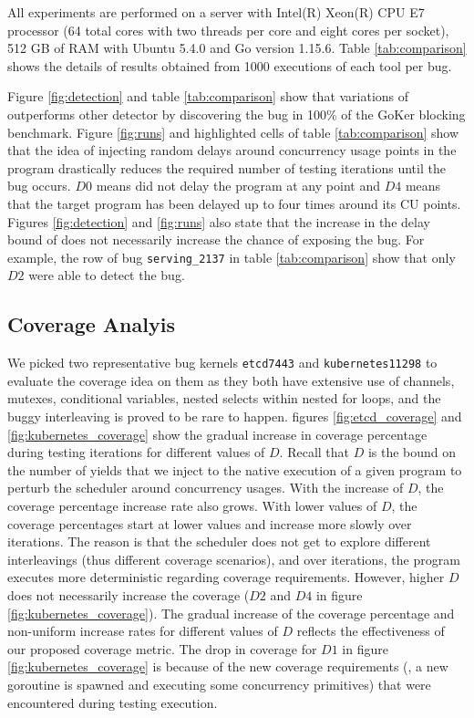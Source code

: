 All experiments are performed on a server with Intel(R) Xeon(R) CPU E7 processor (64 total cores with two threads per core and eight cores per socket), 512 GB of RAM with Ubuntu 5.4.0 and Go version 1.15.6.
%
Table \ref{tab:comparison} shows the details of results obtained from 1000 executions of each tool per bug.
%

%


%
Figure \ref{fig:detection} and table \ref{tab:comparison} show that variations of \goat outperforms other detector by discovering the bug in 100\% of the GoKer blocking benchmark.
%
Figure \ref{fig:runs} and highlighted cells of table \ref{tab:comparison} show that the idea of injecting random delays around concurrency usage points in the program drastically reduces the required number of testing iterations until the bug occurs.
%
$D0$ means \goat did not delay the program at any point and $D4$ means that the target program has been delayed up to four times around its CU points.
%
Figures \ref{fig:detection} and \ref{fig:runs} also state that the increase in the delay bound of \goat does not necessarily increase the chance of exposing the bug.
%
For example, the row of bug \texttt{serving\_2137} in table \ref{tab:comparison} show that only \goat $D2$ were able to detect the bug.




\subsection{Coverage Analyis}
We picked two representative bug kernels \texttt{etcd7443} and \texttt{kubernetes11298} to evaluate the coverage idea on them as they both have extensive use of channels, mutexes, conditional variables, nested selects within nested for loops, and the buggy interleaving is proved to be rare to happen.
%
figures \ref{fig:etcd_coverage} and \ref{fig:kubernetes_coverage} show the gradual increase in coverage percentage during testing iterations for different values of $D$.
%
Recall that $D$ is the bound on the number of yields that we inject to the native execution of a given program to perturb the scheduler around concurrency usages.
%
With the increase of $D$, the coverage percentage increase rate also grows.
%
With lower values of $D$, the coverage percentages start at lower values and increase more slowly over iterations.
%
The reason is that the scheduler does not get to explore different interleavings (thus different coverage scenarios), and over iterations, the program executes more deterministic regarding coverage requirements.
%
However, higher $D$ does not necessarily increase the coverage ($D2$ and $D4$ in figure \ref{fig:kubernetes_coverage}).
%
The gradual increase of the coverage percentage and non-uniform increase rates for different values of $D$ reflects the effectiveness of our proposed coverage metric.
%
The drop in coverage for $D1$ in figure \ref{fig:kubernetes_coverage} is because of the new coverage requirements (\eg, a new goroutine is spawned and executing some concurrency primitives) that were encountered during testing execution.
%
